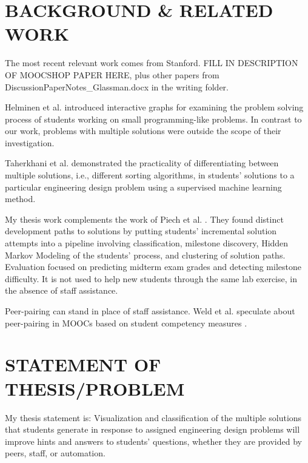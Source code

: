 \documentclass[12pt]{article}
\begin{document}
\section{BACKGROUND \& RELATED WORK}

The most recent relevant work comes from Stanford. {\color{red}FILL IN DESCRIPTION OF MOOCSHOP PAPER HERE, plus other papers from DiscussionPaperNotes\_Glassman.docx in the writing folder.}

Helminen et al. \cite{ICERHelminen} introduced interactive graphs for examining the problem solving process of students working on small programming-like problems. In contrast to our work, problems with multiple solutions were outside the scope of their investigation.

Taherkhani et al. \cite{taherkhani12} demonstrated the practicality of differentiating between multiple solutions, i.e., different sorting algorithms, in students' solutions to a particular engineering design problem using a supervised machine learning method.

My thesis work complements the work of Piech et al. \cite{Piech}. They found distinct development paths to solutions by putting students' incremental solution attempts into a pipeline involving classification, milestone discovery, Hidden Markov Modeling of the students' process, and clustering of solution paths. Evaluation focused on predicting midterm exam grades and detecting milestone difficulty. It is not used to help new students through the same lab exercise, in the absence of staff assistance.

Peer-pairing can stand in place of staff assistance. Weld et al. speculate about peer-pairing in MOOCs based on student competency measures \cite{WeldHcomp12}.



\section{STATEMENT OF THESIS/PROBLEM}

My thesis statement is: Visualization and classification of the multiple solutions that students generate in response to assigned engineering design problems will improve hints and answers to students' questions, whether they are provided by peers, staff, or automation. 
\end{document}
